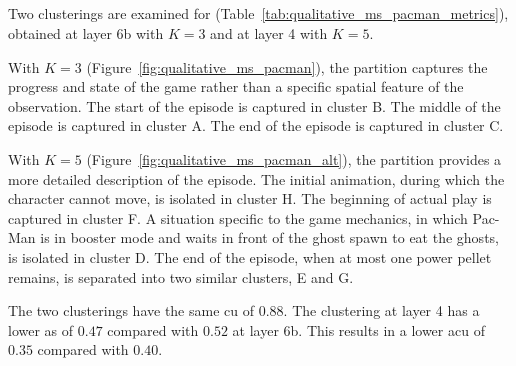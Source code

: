 \newpage
\subsection{\MsPacManName}

Two clusterings are examined for \MsPacManName (Table~\ref{tab:qualitative_ms_pacman_metrics}), obtained at layer 6b with $K=3$ and at layer 4 with $K=5$.

With $K=3$ (Figure~\ref{fig:qualitative_ms_pacman}), the partition captures the progress and state of the game rather than a specific spatial feature of the observation.
The start of the episode is captured in cluster B.
The middle of the episode is captured in cluster A.
The end of the episode is captured in cluster C.

With $K=5$ (Figure~\ref{fig:qualitative_ms_pacman_alt}), the partition provides a more detailed description of the episode.
The initial animation, during which the character cannot move, is isolated in cluster H.
The beginning of actual play is captured in cluster F.
A situation specific to the game mechanics, in which Pac-Man is in booster mode and waits in front of the ghost spawn to eat the ghosts, is isolated in cluster D.
The end of the episode, when at most one power pellet remains, is separated into two similar clusters, E and G.

The two clusterings have the same \gls{cu} of $0.88$.
The clustering at layer 4 has a lower \gls{as} of $0.47$ compared with $0.52$ at layer 6b.
This results in a lower \gls{acu} of $0.35$ compared with $0.40$.

